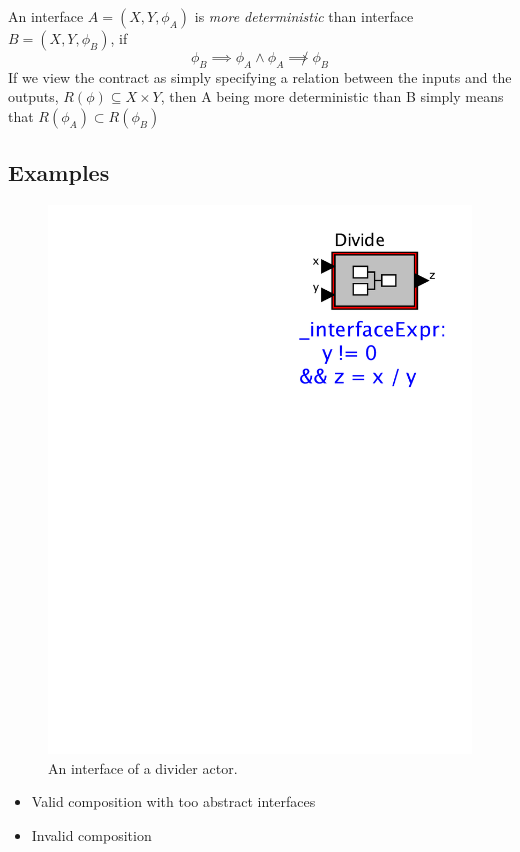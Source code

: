\documentclass[preprint,11pt]{sigplanconf}
\begin{document}
An interface $A=(X,Y,\phi_A)$ is \emph{more deterministic} than interface
$B=(X,Y,\phi_B)$, if
\[
\phi_B \implies \phi_A \wedge \phi_A \not\implies \phi_B
\]
If we view the contract as simply specifying a relation between the inputs and
the outputs, $R(\phi) \subseteq X \times Y$, then A being more deterministic
than B simply means that $R(\phi_A) \subset R(\phi_B)$

\subsection{Examples}
\begin{figure}[htbp]
\centering
\includegraphics[width=\columnwidth]{figs/Divide2} 
\caption{An interface of a divider actor.}
\label{fig:divider}
\end{figure}

\begin{itemize}
	\item Valid composition with too abstract interfaces
	\item Invalid composition
\end{itemize}
\end{document}
